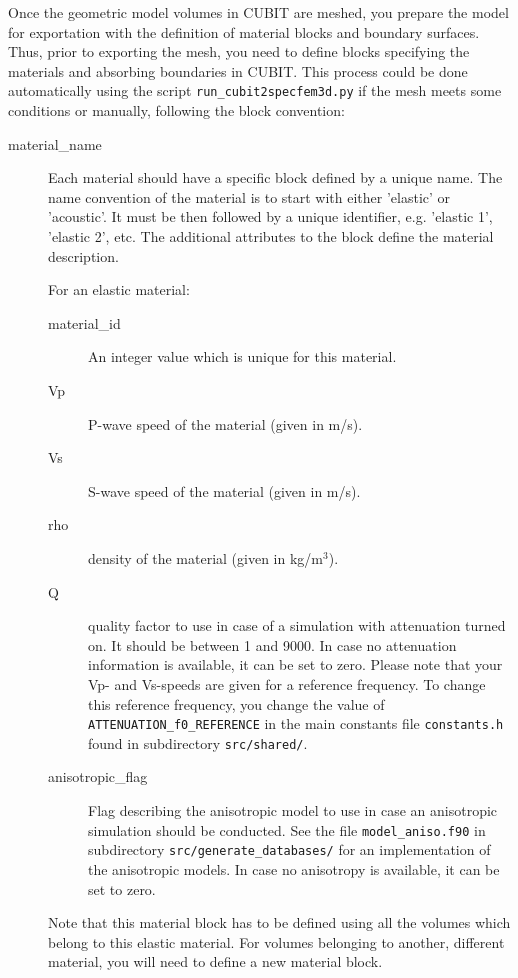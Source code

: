 Once the geometric model volumes in CUBIT are meshed, you prepare
the model for exportation with the definition of material blocks and
boundary surfaces. Thus, prior to exporting the mesh, you need to
define blocks specifying the materials and absorbing boundaries in
CUBIT. This process could be done automatically using the script \texttt{run\_cubit2specfem3d.py}
if the mesh meets some conditions or manually, following the block
convention:
\begin{description}
\item [{material\_name}] Each material should have a specific block defined
by a unique name. The name convention of the material is to start
with either 'elastic' or 'acoustic'. It must be then followed by a
unique identifier, e.g. 'elastic 1', 'elastic 2', etc. The additional
attributes to the block define the material description.


For an elastic material:
\begin{description}
\item [{material\_id}] An integer value which is unique for this material.
\item [{Vp}] P-wave speed of the material (given in m/s).
\item [{Vs}] S-wave speed of the material (given in m/s).
\item [{rho}] density of the material (given in kg/m$^{3}$).
\item [{Q}] quality factor to use in case of a simulation with attenuation
turned on. It should be between 1 and 9000. In case no attenuation
information is available, it can be set to zero. Please note that
your Vp- and Vs-speeds are given for a reference frequency. To change
this reference frequency, you change the value of \texttt{ATTENUATION\_f0\_REFERENCE}
in the main constants file \texttt{constants.h} found in subdirectory
\texttt{src/shared/}.
\item [{anisotropic\_flag}] Flag describing the anisotropic model to use
in case an anisotropic simulation should be conducted. See the file
\texttt{model\_aniso.f90} in subdirectory \texttt{src/generate\_databases/}
for an implementation of the anisotropic models. In case no anisotropy
is available, it can be set to zero.
\end{description}

Note that this material block has to be defined using all the volumes
which belong to this elastic material. For volumes belonging to another,
different material, you will need to define a new material block.



\end{description}
